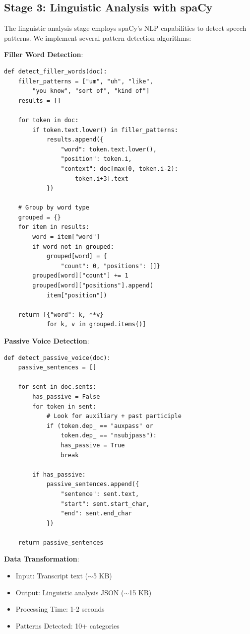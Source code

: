 \documentclass[conference]{IEEEtran}
\begin{document}
\subsection{Stage 3: Linguistic Analysis with spaCy}

The linguistic analysis stage employs spaCy's NLP capabilities to detect speech patterns. We implement several pattern detection algorithms:

\textbf{Filler Word Detection}:
\begin{lstlisting}[caption={Filler Word Detection Algorithm}]
def detect_filler_words(doc):
    filler_patterns = ["um", "uh", "like", 
        "you know", "sort of", "kind of"]
    results = []
    
    for token in doc:
        if token.text.lower() in filler_patterns:
            results.append({
                "word": token.text.lower(),
                "position": token.i,
                "context": doc[max(0, token.i-2):
                    token.i+3].text
            })
    
    # Group by word type
    grouped = {}
    for item in results:
        word = item["word"]
        if word not in grouped:
            grouped[word] = {
                "count": 0, "positions": []}
        grouped[word]["count"] += 1
        grouped[word]["positions"].append(
            item["position"])
    
    return [{"word": k, **v} 
            for k, v in grouped.items()]
\end{lstlisting}

\textbf{Passive Voice Detection}:
\begin{lstlisting}[caption={Passive Voice Detection}]
def detect_passive_voice(doc):
    passive_sentences = []
    
    for sent in doc.sents:
        has_passive = False
        for token in sent:
            # Look for auxiliary + past participle
            if (token.dep_ == "auxpass" or 
                token.dep_ == "nsubjpass"):
                has_passive = True
                break
        
        if has_passive:
            passive_sentences.append({
                "sentence": sent.text,
                "start": sent.start_char,
                "end": sent.end_char
            })
    
    return passive_sentences
\end{lstlisting}

\textbf{Data Transformation}:
\begin{itemize}
    \item Input: Transcript text ($\sim$5 KB)
    \item Output: Linguistic analysis JSON ($\sim$15 KB)
    \item Processing Time: 1-2 seconds
    \item Patterns Detected: 10+ categories
\end{itemize}
\end{document}
